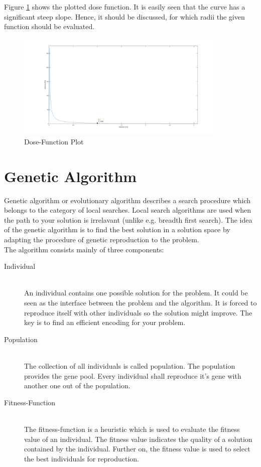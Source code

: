\documentclass[12pt]{article}
\begin{document}
Figure \ref{fig:doseplot} shows the plotted dose function. It is easily seen that the curve has a significant steep slope. Hence, it should be discussed, for which radii the given function should be evaluated.

\begin{figure}[htbp]

\centering
\includegraphics[width=0.9\textwidth]{pictures/dosefunction}
\caption{Dose-Function Plot}
\label{fig:doseplot}
\end{figure}
\section{Genetic Algorithm}
\label{sec:genalg}

Genetic algorithm  or evolutionary algorithm \cite{genpro} describes a search procedure which belongs to the category of local searches\cite{aima}. Local search algorithms are used when the path to your solution is irrelavant (unlike e.g. breadth first search). The idea of the genetic algorithm is to find the best solution in a solution space by adapting the procedure of genetic reproduction to the problem. \\ 
The algorithm consists mainly of three components:

\begin{description}
\item[Individual]~\\
\label{indiv}
An individual contains one possible solution for the problem. It could be seen as the interface between the problem and the algorithm.  It is forced to reproduce itself with other individuals so the solution might improve. The key is to find an efficient encoding for your problem.
\item[Population]~\\
\label{pop}
The collection of all individuals is called population. The population provides the gene pool. Every individual shall reproduce it's gene with another one out of the population. 
\item[Fitness-Function]~\\
\label{fifu}
The fitness-function is a heuristic which is used to evaluate the fitness value of an individual. The fitness value indicates the quality of a solution contained by the individual. Further on, the fitness value is used to select the best individuals for reproduction.
\end{description} 
\end{document}
